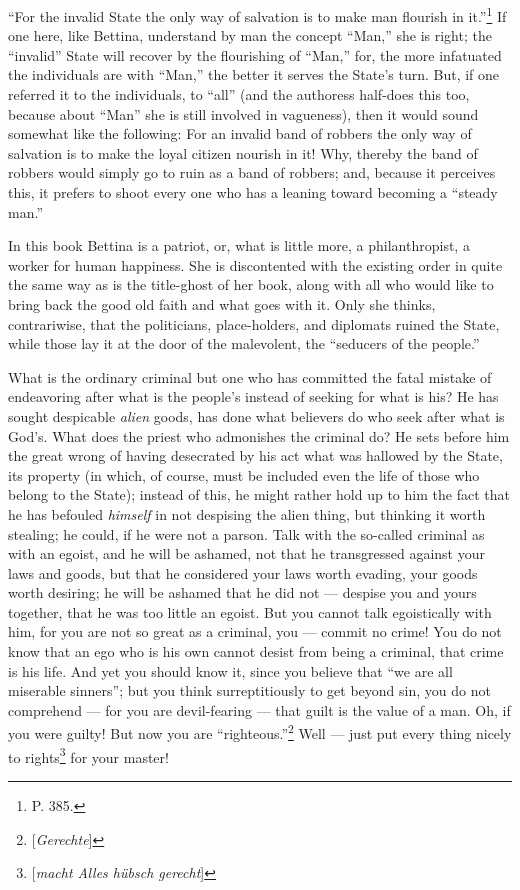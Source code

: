 ``For the invalid State the only way of salvation is to make man flourish in 
it.''\footnote{P. 385.} If one here, like Bettina, understand by man the 
concept ``Man,'' she is right; the ``invalid'' State will recover by the 
flourishing of ``Man,'' for, the more infatuated the individuals are with 
``Man,'' the better it serves the State's turn. But, if one referred it to 
the individuals, to ``all'' (and the authoress half-does this too, because 
about ``Man'' she is still involved in vagueness), then it would sound 
somewhat like the following: For an invalid band of robbers the only way of 
salvation is to make the loyal citizen nourish in it! Why, thereby the band of 
robbers would simply go to ruin as a band of robbers; and, because it 
perceives this, it prefers to shoot every one who has a leaning toward 
becoming a ``steady man.''

In this book Bettina is a patriot, or, what is little more, a philanthropist, 
a worker for human happiness. She is discontented with the existing order in 
quite the same way as is the title-ghost of her book, along with all who would 
like to bring back the good old faith and what goes with it. Only she thinks, 
contrariwise, that the politicians, place-holders, and diplomats ruined the 
State, while those lay it at the door of the malevolent, the ``seducers of 
the people.''

What is the ordinary criminal but one who has committed the fatal mistake of 
endeavoring after what is the people's instead of seeking for what is his? He 
has sought despicable \textit{alien} goods, has done what believers do who 
seek after what is God's. What does the priest who admonishes the criminal do? 
He sets before him the great wrong of having desecrated by his act what was 
hallowed by the State, its property (in which, of course, must be included 
even the life of those who belong to the State); instead of this, he might 
rather hold up to him the fact that he has befouled \textit{himself} in not 
despising the alien thing, but thinking it worth stealing; he could, if he 
were not a parson. Talk with the so-called criminal as with an egoist, and he 
will be ashamed, not that he transgressed against your laws and goods, but 
that he considered your laws worth evading, your goods worth desiring; he will 
be ashamed that he did not --- despise you and yours together, that he was too 
little an egoist. But you cannot talk egoistically with him, for you are not 
so great as a criminal, you --- commit no crime! You do not know that an ego 
who is his own cannot desist from being a criminal, that crime is his life. 
And yet you should know it, since you believe that ``we are all miserable 
sinners''; but you think surreptitiously to get beyond sin, you do not 
comprehend --- for you are devil-fearing --- that guilt is the value of a man. 
Oh, if you were guilty! But now you are 
``righteous.''\footnote{[\textit{Gerechte}]} Well --- just put every thing 
nicely to rights\footnote{[\textit{macht Alles h\"ubsch gerecht}]} for your 
master!

